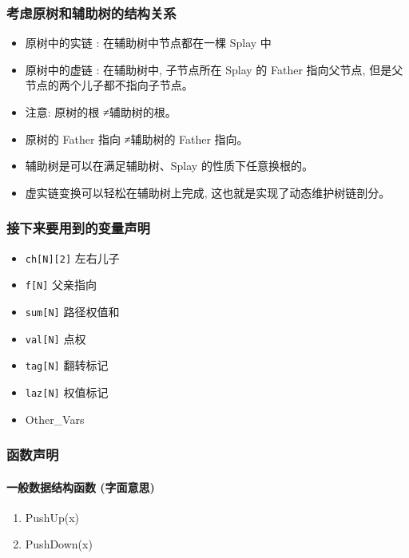 \subsubsection{考虑原树和辅助树的结构关系}

\begin{itemize}
\item 原树中的实链 : 在辅助树中节点都在一棵 Splay 中
\item 原树中的虚链 : 在辅助树中, 子节点所在 Splay 的 Father 指向父节点, 但是父节点的两个儿子都不指向子节点。
\item 注意: 原树的根 ≠辅助树的根。
\item 原树的 Father 指向 ≠辅助树的 Father 指向。
\item 辅助树是可以在满足辅助树、Splay 的性质下任意换根的。
\item 虚实链变换可以轻松在辅助树上完成, 这也就是实现了动态维护树链剖分。
\end{itemize}

\subsubsection{接下来要用到的变量声明}

\begin{itemize}
\item \texttt{ch[N][2]} 左右⼉子 
\item \texttt{f[N]} ⽗亲指向
\item \texttt{sum[N]} 路径权值和 
\item \texttt{val[N]} 点权
\item \texttt{tag[N]} 翻转标记
\item \texttt{laz[N]} 权值标记 
\item Other\_Vars
\end{itemize}

\subsubsection{函数声明}

\paragraph{⼀般数据结构函数 (字面意思)}

\begin{enumerate}
\item PushUp(x)
\item PushDown(x)
\end{enumerate}

